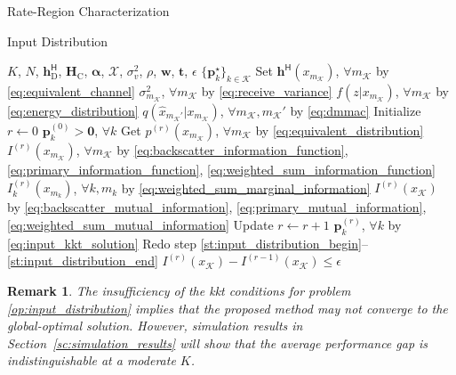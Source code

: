\documentclass[journal]{IEEEtran}
\makeatletter
\newtheorem{remark}{Remark}
\newcommand\setalgorithmcaptionfont[1]{%
	\let\my@floatc@ruled\floatc@ruled          %
	\def\floatc@ruled{%
		\global\let\floatc@ruled\my@floatc@ruled %
		#1\floatc@ruled}}
\makeatother
\begin{document}
\begin{section}{Rate-Region Characterization}
\begin{subsection}{Input Distribution}
		\setalgorithmcaptionfont{\small}
		\begin{algorithm}[!t]
			\small
			\caption{Input Distribution Evaluation by a Sequence}
			\label{al:input_distribution}
			\begin{algorithmic}[1]
				\Require $K$, $N$, $\boldsymbol{h}_{\text{D}}^\mathsf{H}$, $\boldsymbol{H}_{\text{C}}$, $\boldsymbol{\alpha}$, $\mathcal{X}$, $\sigma_v^2$, $\rho$, $\boldsymbol{w}$, $\boldsymbol{t}$, $\epsilon$
				\Ensure $\{\boldsymbol{p}_k^\star\}_{k \in \mathcal{K}}$
				\State Set $\boldsymbol{h}^\mathsf{H}(x_{m_{\mathcal{K}}})$, $\forall m_{\mathcal{K}}$ by \eqref{eq:equivalent_channel}
				\State \phantom{Set} $\sigma^2_{m_{\mathcal{K}}}$, $\forall m_{\mathcal{K}}$ by \eqref{eq:receive_variance}
				\State \phantom{Set} $f(z|x_{m_{\mathcal{K}}})$, $\forall m_{\mathcal{K}}$ by \eqref{eq:energy_distribution}
				\State \phantom{Set} $q(\hat{x}_{m_{\mathcal{K}}'}|x_{m_{\mathcal{K}}})$, $\forall m_{\mathcal{K}}, m_{\mathcal{K}}'$ by \eqref{eq:dmmac}
				\State Initialize $r \gets 0$
				\State \phantom{Initialize} $\boldsymbol{p}_k^{(0)} > \boldsymbol{0}$, $\forall k$
				\State Get $p^{(r)}(x_{m_{\mathcal{K}}})$, $\forall m_{\mathcal{K}}$ by \eqref{eq:equivalent_distribution} \label{st:input_distribution_begin}
				\State \phantom{Get} $I^{(r)}(x_{m_{\mathcal{K}}})$, $\forall m_{\mathcal{K}}$ by \eqref{eq:backscatter_information_function}, \eqref{eq:primary_information_function}, \eqref{eq:weighted_sum_information_function}
				\State \phantom{Get} $I^{(r)}_k(x_{m_k})$, $\forall k,m_k$ by \eqref{eq:weighted_sum_marginal_information}
				\State \phantom{Get} $I^{(r)}(x_{\mathcal{K}})$ by \eqref{eq:backscatter_mutual_information}, \eqref{eq:primary_mutual_information}, \eqref{eq:weighted_sum_mutual_information} \label{st:input_distribution_end}
				\Repeat
					\State Update $r \gets r+1$
					\State \phantom{Update} $\boldsymbol{p}_k^{(r)}$, $\forall k$ by \eqref{eq:input_kkt_solution}
					\State Redo step \ref{st:input_distribution_begin}--\ref{st:input_distribution_end}
				\Until $I^{(r)}(x_{\mathcal{K}}) - I^{(r-1)}(x_{\mathcal{K}}) \le \epsilon$
			\end{algorithmic}
		\end{algorithm}

		\begin{remark}
			The insufficiency of the \gls{kkt} conditions for problem \eqref{op:input_distribution} implies that the proposed method may not converge to the global-optimal solution.
			However, simulation results in Section~\ref{sc:simulation_results} will show that the average performance gap is indistinguishable at a moderate $K$.
			\label{re:input_kkt_distribution}
		\end{remark}
	\end{subsection}


\end{section}
\end{document}
